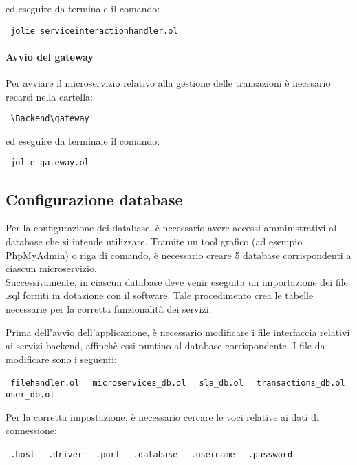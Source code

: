 	ed eseguire da terminale il comando:
	
	\begin{center}
		\verb| jolie serviceinteractionhandler.ol |
	\end{center}


\paragraph{Avvio del gateway}
	Per avviare il microservizio relativo alla gestione delle transazioni è necesario recarsi nella cartella:
	\begin{center}
		\verb| \Backend\gateway|
	\end{center}
	
	ed eseguire da terminale il comando:
	
	\begin{center}
		\verb| jolie gateway.ol |
	\end{center}

\newpage
\subsection{Configurazione database}

Per la configurazione dei database, è necessario avere accessi amministrativi al database che si intende utilizzare. Tramite un tool grafico (ad esempio PhpMyAdmin) o riga di comando, è necessario creare 5 database corrispondenti a ciascun microservizio. \\ Successivamente, in ciascun database deve venir eseguita un importazione dei file .sql forniti in dotazione con il software. Tale procedimento crea le tabelle necessarie per la corretta funzionalità dei servizi.

Prima dell'avvio dell'applicazione, è necessario modificare i file interfaccia relativi ai servizi backend, affinchè essi puntino al database corrispondente. I file da modificare sono i seguenti:
\begin{center}
	\verb| filehandler.ol |
	\verb| microservices_db.ol |
	\verb| sla_db.ol |
	\verb| transactions_db.ol |
	\verb| user_db.ol |
\end{center}

Per la corretta impostazione, è necessario cercare le voci relative ai dati di connessione:

\begin{center}
	\verb| .host |
	\verb| .driver |
	\verb| .port |
	\verb| .database |
	\verb| .username |
	\verb| .password |
\end{center}

